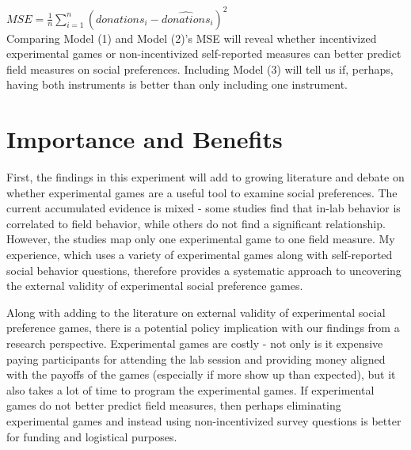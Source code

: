 \documentclass{article}
\begin{document}
\( MSE = \frac{1}{n}\sum_{i=1}^{n}(donations_{i}-\hat{donations}_{i})^{2} \) \\


Comparing Model (1) and Model (2)\rq s MSE will reveal whether incentivized experimental games or non-incentivized self-reported measures can better predict field measures on social preferences. Including Model (3) will tell us if, perhaps, having both instruments is better than only including one instrument.


\section{Importance and Benefits}

First, the findings in this experiment will add to growing literature and debate on whether experimental games are a useful tool to examine social preferences. The current accumulated evidence is mixed - some studies find that in-lab behavior is correlated to field behavior, while others do not find a significant relationship. However, the studies map only one experimental game to one field measure. My experience, which uses a variety of experimental games along with self-reported social behavior questions, therefore provides a systematic approach to uncovering the external validity of experimental social preference games. 

Along with adding to the literature on external validity of experimental social preference games, there is a potential policy implication with our findings from a research perspective. Experimental games are costly - not only is it expensive paying participants for attending the lab session and providing money aligned with the payoffs of the games (especially if more show up than expected), but it also takes a lot of time to program the experimental games. If experimental games do not better predict field measures, then perhaps eliminating experimental games and instead using non-incentivized survey questions is better for funding and logistical purposes. 
\end{document}
